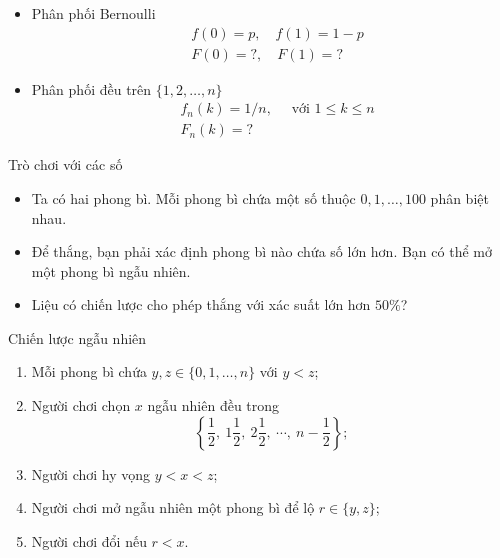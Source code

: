 \begin{frame}
	\begin{xmpl}
		\begin{itemize}
			\item Phân phối Bernoulli 
			\begin{align*}
				&f(0) = p, \quad f(1) = 1-p\\
				&F(0) = ?, \quad F(1) = ?
			\end{align*}
			\item Phân phối đều trên $\{1,2, \dots, n\}$
			\begin{align*}
				&f_n(k) = 1/n,\quad  \text{ với } 1\leq k\leq n \\
				&F_n(k) = ?
			\end{align*}
			 
		\end{itemize}
	\end{xmpl}
\end{frame}

\begin{frame}
	\begin{block}{Trò chơi với các số}
		\begin{itemize}
			\item Ta có hai phong bì. Mỗi phong bì chứa một số thuộc $0,1, \dots, 100$ phân biệt nhau.
			\item Để thắng, bạn phải xác định phong bì nào chứa số lớn hơn. Bạn có thể mở một phong bì ngẫu nhiên.
			\item Liệu có chiến lược cho phép thắng với xác suất lớn hơn $50\%$?   
		\end{itemize}
	\end{block}
\end{frame}

\begin{frame}
	\begin{block}{Chiến lược ngẫu nhiên}
		\begin{enumerate}[\bf 1.]
			\item Mỗi phong bì chứa $y, z \in \{0,1, \dots, n\}$ với $y<z$;
			\item Người chơi chọn $x$ ngẫu nhiên đều trong 
			\[
				\left\{\frac{1}{2},\ 1\frac{1}{2},\
                                  2\frac{1}{2},\ \cdots,\  n - \frac{1}{2}\right\};
			\]  
			\item Người chơi hy vọng $y < x < z$; 
			\item Người chơi mở ngẫu nhiên một phong bì để lộ $r \in \{y,z\}$;
			\item Người chơi đổi nếu $r < x$.  
		\end{enumerate}
	\end{block}
	
\end{frame}

